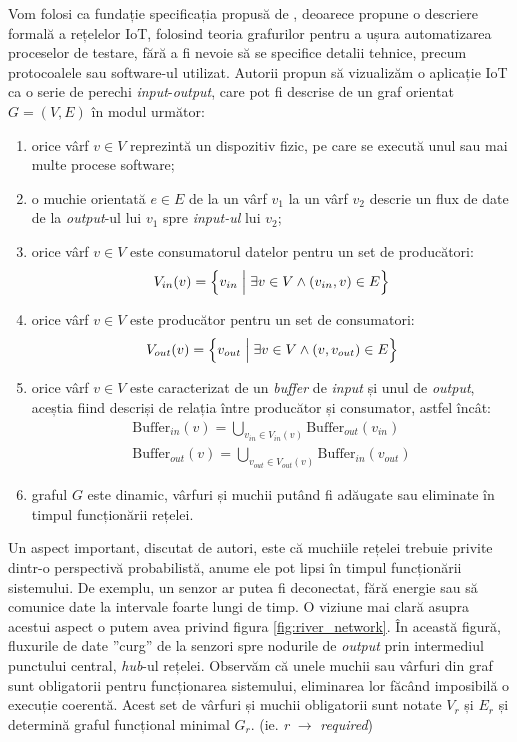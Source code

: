 Vom folosi ca fundație specificația propusă de \citet{Paduraru2021}, deoarece propune o descriere formală a rețelelor IoT, folosind teoria grafurilor pentru a ușura automatizarea proceselor de testare, fără a fi nevoie să se specifice detalii tehnice, precum protocoalele sau software-ul utilizat. Autorii propun să vizualizăm o aplicație IoT ca o serie de perechi \textit{input}-\textit{output}, care pot fi descrise de un graf orientat $G = (V, E)$ în modul următor:

\begin{enumerate}
    \item orice vârf $v \in V$ reprezintă un dispozitiv fizic, pe care se execută unul sau mai multe procese software;
    \item o muchie orientată $e \in E$ de la un vârf $v_1$ la un vârf $v_2$ descrie un flux de date de la \textit{output}-ul lui $v_1$ spre \textit{input-ul} lui $v_2$;
    \item orice vârf $v \in V$ este consumatorul datelor pentru un set de producători: 
        \begin{gather*}
            V_{in}(v) = \Big{\{} v_{in} \; \Big{|} \; \exists v \in V \land (v_{in}, v) \in E \Big{\}}
        \end{gather*}
    \item orice vârf $v \in V$ este producător pentru un set de consumatori:
        \begin{gather*}
            V_{out}(v) = \Big{\{} v_{out} \; \Big{|} \; \exists v \in V \land (v, v_{out}) \in E \Big{\}}
        \end{gather*}
    \item orice vârf $v \in V$ este caracterizat de un \textit{buffer} de \textit{input} și unul de \textit{output}, aceștia fiind descriși de relația între producător și consumator, astfel încât: 
        \begin{gather*}
            \mathrm{Buffer}_{in}(v) = \bigcup_{v_{in} \in V_{in}(v)} \mathrm{Buffer}_{out}(v_{in}) \\
            \mathrm{Buffer}_{out}(v) = \bigcup_{v_{out} \in V_{out}(v)} \mathrm{Buffer}_{in}(v_{out})
        \end{gather*}
    \item graful $G$ este dinamic, vârfuri și muchii putând fi adăugate sau eliminate în timpul funcționării rețelei.
\end{enumerate}

Un aspect important, discutat de autori, este că muchiile rețelei trebuie privite dintr-o perspectivă probabilistă, anume ele pot lipsi în timpul funcționării sistemului. De exemplu, un senzor ar putea fi deconectat, fără energie sau să comunice date la intervale foarte lungi de timp. O viziune mai clară asupra acestui aspect o putem avea privind figura \ref{fig:river_network}. În această figură, fluxurile de date ”curg” de la senzori spre nodurile de \textit{output} prin intermediul punctului central, \textit{hub}-ul rețelei. Observăm că unele muchii sau vârfuri din graf sunt obligatorii pentru funcționarea sistemului, eliminarea lor făcând imposibilă o execuție coerentă. Acest set de vârfuri și muchii obligatorii sunt notate $V_r$ și $E_r$ și determină graful funcțional minimal $G_r$. (ie. \textit{r} $\rightarrow$ \textit{required})

